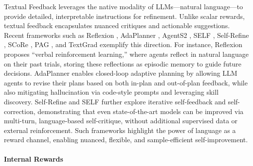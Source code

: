 Textual Feedback leverages the native modality of LLMs—natural language—to provide detailed, interpretable instructions for refinement. Unlike scalar rewards, textual feedback encapsulates nuanced critiques and actionable suggestions. Recent frameworks such as Reflexion \citep{shinn2023reflexion}, AdaPlanner \citep{sun2023adaplanner}, AgentS2 \citep{agashe2025agents2}, SELF \citep{lu2023self}, Self-Refine \citep{madaan2023self_refine}, SCoRe \citep{kumar2024training}, PAG \citep{jiang2025pag}, and TextGrad \citep{yellamraju2024textgrad} exemplify this direction. For instance, Reflexion proposes “verbal reinforcement learning,” where agents reflect in natural language on their past trials, storing these reflections as episodic memory to guide future decisions. AdaPlanner enables closed-loop adaptive planning by allowing LLM agents to revise their plans based on both in-plan and out-of-plan feedback, while also mitigating hallucination via code-style prompts and leveraging skill discovery. Self-Refine and SELF further explore iterative self-feedback and self-correction, demonstrating that even state-of-the-art models can be improved via multi-turn, language-based self-critique, without additional supervised data or external reinforcement. Such frameworks highlight the power of language as a reward channel, enabling nuanced, flexible, and sample-efficient self-improvement.


\paragraph{Internal Rewards}

